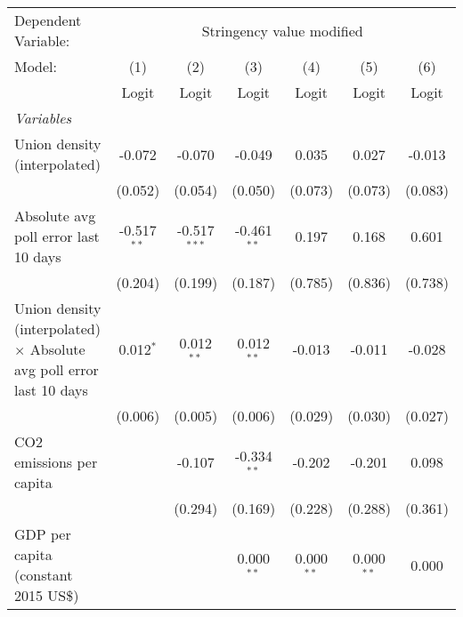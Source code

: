 
\begingroup
\centering
\begin{tabular}{lcccccc}
   \toprule
   Dependent Variable: & \multicolumn{6}{c}{Stringency value modified}\\
   Model:                                                                      & (1)           & (2)            & (3)           & (4)          & (5)          & (6)\\  
                                                                               &  Logit        & Logit          & Logit         & Logit        & Logit        & Logit\\  
   \midrule
   \emph{Variables}\\
   Union density (interpolated)                                                & -0.072        & -0.070         & -0.049        & 0.035        & 0.027        & -0.013\\   
                                                                               & (0.052)       & (0.054)        & (0.050)       & (0.073)      & (0.073)      & (0.083)\\   
   Absolute avg poll error last 10 days                                        & -0.517$^{**}$ & -0.517$^{***}$ & -0.461$^{**}$ & 0.197        & 0.168        & 0.601\\   
                                                                               & (0.204)       & (0.199)        & (0.187)       & (0.785)      & (0.836)      & (0.738)\\   
   Union density (interpolated) $\times$ Absolute avg poll error last 10 days  & 0.012$^{*}$   & 0.012$^{**}$   & 0.012$^{**}$  & -0.013       & -0.011       & -0.028\\   
                                                                               & (0.006)       & (0.005)        & (0.006)       & (0.029)      & (0.030)      & (0.027)\\   
   CO2 emissions per capita                                                    &               & -0.107         & -0.334$^{**}$ & -0.202       & -0.201       & 0.098\\   
                                                                               &               & (0.294)        & (0.169)       & (0.228)      & (0.288)      & (0.361)\\   
   GDP per capita (constant 2015 US\$)                                         &               &                & 0.000$^{**}$  & 0.000$^{**}$ & 0.000$^{**}$ & 0.000\\   

\end{tabular}
